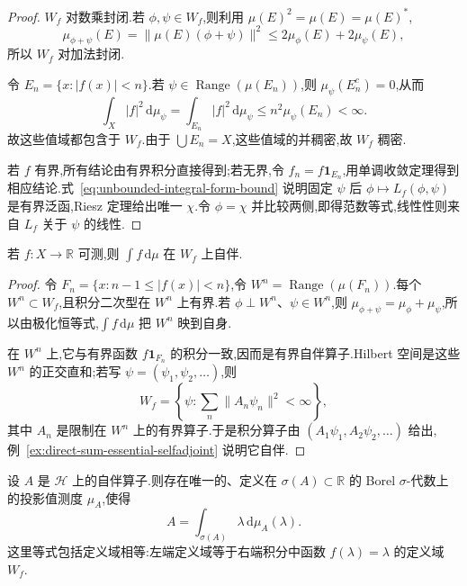 \begin{proof}
\(W_{f}\) 对数乘封闭.若 \(\phi,\psi\in W_{f}\),则利用 \(\mu(E)^{2}=\mu(E)=\mu(E)^{*}\),
\[
\mu_{\phi+\psi}(E)=\|\mu(E)(\phi+\psi)\|^{2}
\leq2\mu_{\phi}(E)+2\mu_{\psi}(E),
\]
所以 \(W_{f}\) 对加法封闭.

令 \(E_{n}=\{x:|f(x)|<n\}\).若 \(\psi\in\operatorname{Range}(\mu(E_{n}))\),则 \(\mu_{\psi}(E_{n}^{c})=0\),从而
\[
\int_{X}|f|^{2}\,\mathrm{d}\mu_{\psi}
=\int_{E_{n}}|f|^{2}\,\mathrm{d}\mu_{\psi}
\leq n^{2}\mu_{\psi}(E_{n})<\infty.
\]
故这些值域都包含于 \(W_{f}\).由于 \(\bigcup E_{n}=X\),这些值域的并稠密,故 \(W_{f}\) 稠密.

若 \(f\) 有界,所有结论由有界积分直接得到;若无界,令 \(f_{n}=f\mathbf{1}_{E_{n}}\),用单调收敛定理得到相应结论.式~\eqref{eq:unbounded-integral-form-bound} 说明固定 \(\psi\) 后 \(\phi\mapsto L_{f}(\phi,\psi)\) 是有界泛函,Riesz 定理给出唯一 \(\chi\).令 \(\phi=\chi\) 并比较两侧,即得范数等式,线性性则来自 \(L_{f}\) 关于 \(\psi\) 的线性.
\end{proof}

\begin{proposition}[实值无界积分的自伴性]\label{prop:real-unbounded-integral-selfadjoint}
若 \(f:X\to\mathbb{R}\) 可测,则 \(\int f\,\mathrm{d}\mu\) 在 \(W_{f}\) 上自伴.
\end{proposition}

\begin{proof}
令 \(F_{n}=\{x:n-1\leq|f(x)|<n\}\),令 \(W^{n}=\operatorname{Range}(\mu(F_{n}))\).每个 \(W^{n}\subset W_{f}\),且积分二次型在 \(W^{n}\) 上有界.若 \(\phi\perp W^{n}\)、\(\psi\in W^{n}\),则 \(\mu_{\phi+\psi}=\mu_{\phi}+\mu_{\psi}\),所以由极化恒等式,\(\int f\,\mathrm{d}\mu\) 把 \(W^{n}\) 映到自身.

在 \(W^{n}\) 上,它与有界函数 \(f\mathbf{1}_{F_{n}}\) 的积分一致,因而是有界自伴算子.Hilbert 空间是这些 \(W^{n}\) 的正交直和;若写 \(\psi=(\psi_{1},\psi_{2},\ldots)\),则
\[
W_{f}=\left\{\psi:\sum_{n}\|A_{n}\psi_{n}\|^{2}<\infty\right\},
\]
其中 \(A_{n}\) 是限制在 \(W^{n}\) 上的有界算子.于是积分算子由 \((A_{1}\psi_{1},A_{2}\psi_{2},\ldots)\) 给出,例~\ref{ex:direct-sum-essential-selfadjoint} 说明它自伴.
\end{proof}

\begin{theorem}\label{thm:unbounded-spectral-first}
设 \(A\) 是 \(\mathcal{H}\) 上的自伴算子.则存在唯一的、定义在 \(\sigma(A)\subset\mathbb{R}\) 的 Borel \(\sigma\)-代数上的投影值测度 \(\mu_{A}\),使得
\[
A=\int_{\sigma(A)}\lambda\,\mathrm{d}\mu_{A}(\lambda).
\label{eq:unbounded-spectral-first}
\]
这里等式包括定义域相等:左端定义域等于右端积分中函数 \(f(\lambda)=\lambda\) 的定义域 \(W_{f}\).
\end{theorem}

